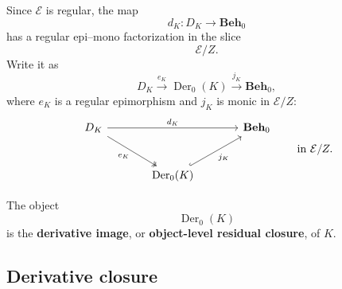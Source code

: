 Since \(\mathcal E\) is regular, the map
\[
    d_K:D_K\to\mathbf{Beh}_0
\]
has a regular epi--mono factorization in the slice
\[
    \mathcal E/Z.
\]
Write it as
\[
    D_K
        \xrightarrow{e_K}
    \operatorname{Der}_0(K)
        \xrightarrow{j_K}
    \mathbf{Beh}_0,
\]
where \(e_K\) is a regular epimorphism and \(j_K\) is monic in \(\mathcal E/Z\):
\[
    \begin{tikzcd}[column sep=large, row sep=large]
            D_K
                \arrow[rr, "d_K"]
                \arrow[dr, two heads, "e_K"']
        &
        &
            \mathbf{Beh}_0
        \\
        &
            \operatorname{Der}_0(K)
                \arrow[ur, hook, "j_K"']
        &
    \end{tikzcd}
    \qquad
    \text{in }\mathcal E/Z.
\]

\begin{definition}
\label{def:derivative-image}
    The object
    \[
        \operatorname{Der}_0(K)
    \]
    is the \textbf{derivative image}, or \textbf{object-level residual closure}, of \(K\).
\end{definition}

\subsection{Derivative closure}
\label{subsec:derivative-closure}


